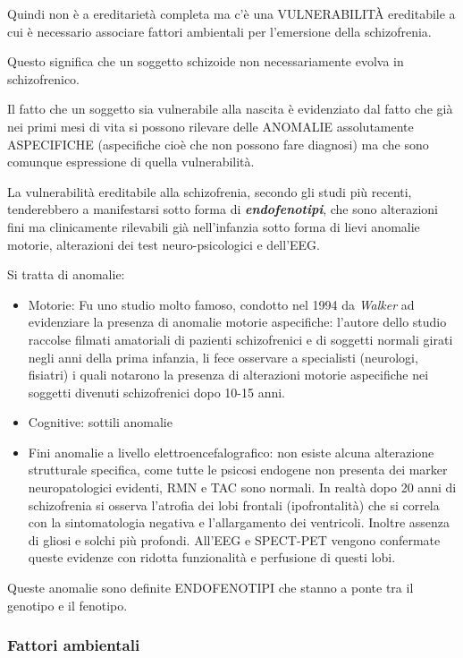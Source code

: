 Quindi non è a ereditarietà completa ma c'è una VULNERABILITÀ
ereditabile a cui è necessario associare fattori ambientali per
l'emersione della schizofrenia.

Questo significa che un soggetto schizoide non necessariamente evolva in
schizofrenico.

Il fatto che un soggetto sia vulnerabile alla nascita è evidenziato dal
fatto che già nei primi mesi di vita si possono rilevare delle ANOMALIE
assolutamente ASPECIFICHE (aspecifiche cioè che non possono fare
diagnosi) ma che sono comunque espressione di quella vulnerabilità.

La vulnerabilità ereditabile alla schizofrenia, secondo gli studi più
recenti, tenderebbero a manifestarsi sotto forma di
\textbf{\emph{endofenotipi}}, che sono alterazioni fini ma clinicamente
rilevabili già nell'infanzia sotto forma di lievi anomalie motorie,
alterazioni dei test neuro-psicologici e dell'EEG.

Si tratta di anomalie:

\begin{itemize}
\item
  Motorie: Fu uno studio molto famoso, condotto nel 1994 da
  \emph{Walker} ad evidenziare la presenza di anomalie motorie
  aspecifiche: l'autore dello studio raccolse filmati amatoriali di
  pazienti schizofrenici e di soggetti normali girati negli anni della
  prima infanzia, li fece osservare a specialisti (neurologi, fisiatri)
  i quali notarono la presenza di alterazioni motorie aspecifiche nei
  soggetti divenuti schizofrenici dopo 10-15 anni.
\item
  Cognitive: sottili anomalie
\item
  Fini anomalie a livello elettroencefalografico: non esiste alcuna
  alterazione strutturale specifica, come tutte le psicosi endogene non
  presenta dei marker neuropatologici evidenti, RMN e TAC sono normali.
  In realtà dopo 20 anni di schizofrenia si osserva l'atrofia dei lobi
  frontali (ipofrontalità) che si correla con la sintomatologia negativa
  e l'allargamento dei ventricoli. Inoltre assenza di gliosi e solchi
  più profondi. All'EEG e SPECT-PET vengono confermate queste evidenze
  con ridotta funzionalità e perfusione di questi lobi.
\end{itemize}

Queste anomalie sono definite ENDOFENOTIPI che stanno a ponte tra il
genotipo e il fenotipo.

\subsubsection{Fattori ambientali}

